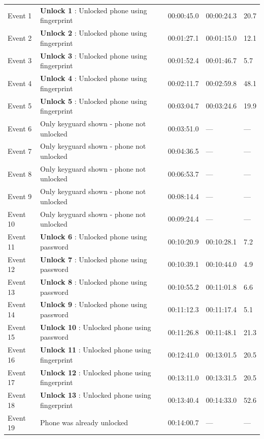 \documentclass{article}
\begin{document}
\begin{enumerate}
\begin{longtable}{p{1.6cm} p{6.4cm} p{3.0cm} p{2.6cm} p{2.2cm}}
        Event 1  & \textbf{Unlock 1} : Unlocked phone using fingerprint & 00:00:45.0 & 00:00:24.3 & 20.7 \\
        Event 2  & \textbf{Unlock 2} : Unlocked phone using fingerprint & 00:01:27.1 & 00:01:15.0 & 12.1 \\
        Event 3  & \textbf{Unlock 3} : Unlocked phone using fingerprint & 00:01:52.4 & 00:01:46.7 & 5.7 \\
        Event 4  & \textbf{Unlock 4} : Unlocked phone using fingerprint & 00:02:11.7 & 00:02:59.8 & 48.1 \\ 
        Event 5  & \textbf{Unlock 5} : Unlocked phone using fingerprint & 00:03:04.7 & 00:03:24.6 & 19.9 \\
        Event 6  & Only keyguard shown - phone not unlocked & 00:03:51.0 & --- & --- \\
        Event 7  & Only keyguard shown - phone not unlocked & 00:04:36.5 & --- & --- \\
        Event 8  & Only keyguard shown - phone not unlocked & 00:06:53.7 & --- & --- \\
        Event 9  & Only keyguard shown - phone not unlocked & 00:08:14.4 & --- & --- \\
        Event 10 & Only keyguard shown - phone not unlocked & 00:09:24.4 & --- & --- \\
        Event 11 & \textbf{Unlock 6} : Unlocked phone using password & 00:10:20.9 & 00:10:28.1 & 7.2 \\
        Event 12 & \textbf{Unlock 7} : Unlocked phone using password & 00:10:39.1 & 00:10:44.0 & 4.9 \\
        Event 13 & \textbf{Unlock 8} : Unlocked phone using password & 00:10:55.2 & 00:11:01.8 & 6.6 \\
        Event 14 & \textbf{Unlock 9} : Unlocked phone using password & 00:11:12.3 & 00:11:17.4 & 5.1 \\
        Event 15 & \textbf{Unlock 10} : Unlocked phone using password & 00:11:26.8 & 00:11:48.1 & 21.3 \\
        Event 16 & \textbf{Unlock 11} : Unlocked phone using fingerprint & 00:12:41.0 & 00:13:01.5 & 20.5 \\
        Event 17 & \textbf{Unlock 12} : Unlocked phone using fingerprint & 00:13:11.0 & 00:13:31.5  & 20.5 \\
        Event 18 & \textbf{Unlock 13} : Unlocked phone using fingerprint & 00:13:40.4 & 00:14:33.0 & 52.6 \\
        Event 19 & Phone was already unlocked & 00:14:00.7& --- & --- \\

\end{longtable}
\end{enumerate}
\end{document}
